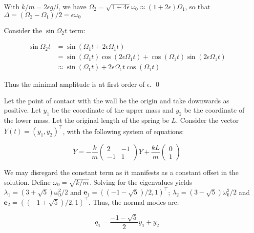 \documentclass[12pt]{article}
\begin{document}
With $k/m = 2\epsilon g/l$, we have $\Omega_{2} = \sqrt{1 + 4\epsilon} \omega_{0} \approx (1 + 2\epsilon) \Omega_{1}$, so that $\Delta = (\Omega_{2} - \Omega_{1})/2 = \epsilon \omega_{0}$

Consider the $\sin{\Omega_{2}t}$ term:

\begin{equation}
    \begin{split}
        \sin{\Omega_{2}t} &= \sin{(\Omega_{1}t + 2\epsilon \Omega_{1}t)} \\
        &= \sin{(\Omega_{1}t)} \cos{(2\epsilon \Omega_{1}t)} + \cos{(\Omega_{1}t)} \sin{(2\epsilon \Omega_{1}t)} \\
        &\approx \sin{(\Omega_{1}t)} + 2\epsilon \Omega_{1}t \cos{(\Omega_{1}t)}
    \end{split}
\end{equation}

Thus the minimal amplitude is at first order of $\epsilon$.
\qed


Let the point of contact with the wall be the origin and take downwards as positive. Let $y_{1}$ be the coordinate of the upper mass and $y_{2}$ be the coordinate of the lower mass. Let the original length of the spring be $L$. Consider the vector $Y(t) = (y_{1}, y_{2})^{\intercal}$, with the following system of equations:

\begin{equation}
    \ddot{Y} =
    -\frac{k}{m}
    \begin{pmatrix}
        2  & -1 \\
        -1 & 1
    \end{pmatrix}
    Y
    +
    \frac{kL}{m}
    \begin{pmatrix}
        0 \\
        1
    \end{pmatrix}
\end{equation}

We may disregard the constant term as it manifests as a constant offset in the solution. Define $\omega_{0} = \sqrt{k/m}$. Solving for the eigenvalues yields $\lambda_{1} = (3 + \sqrt{5})\omega_{0}^{2}/2$ and $\mathbf{e}_{1} = ((-1-\sqrt{5})/2, 1)^{\intercal}$; $\lambda_{2} = (3 - \sqrt{5})\omega_{0}^{2}/2$ and $\mathbf{e}_{2} = ((-1+\sqrt{5})/2, 1)^{\intercal}$. Thus, the normal modes are:

\begin{equation}
    q_{1} = \frac{-1-\sqrt{5}}{2} y_{1} + y_{2}
\end{equation}
\end{document}
